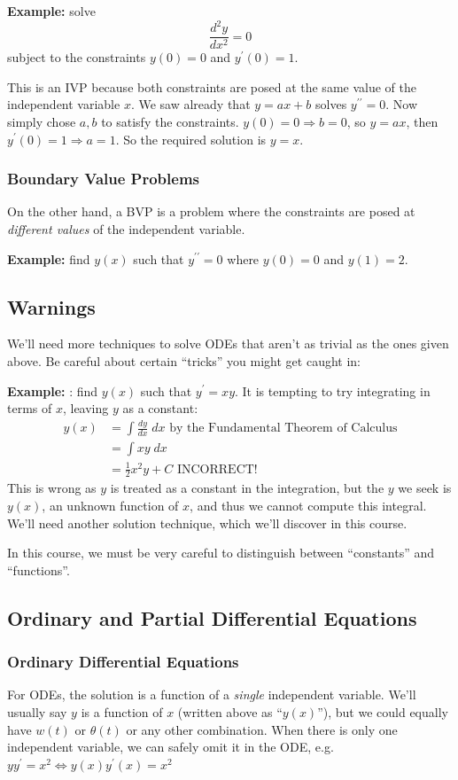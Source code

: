 \documentclass[11pt]{article}
\newcommand{\example}{\textbf{Example: }}
\newcommand{\fdx}{\frac{dy}{dx}} %
\newcommand{\sdx}{\frac{d^2y}{dx^2}}
\newcommand{\yp}{y^{\prime}}
\newcommand{\ypp}{y^{\prime\prime}}
\begin{document}
	\example solve
		$$\sdx = 0$$
		subject to the constraints $y(0) = 0$ and $\yp(0) = 1$.

		This is an IVP because both constraints are posed at the same value of the independent variable $x$.
		We saw already that $y = ax + b$ solves $\ypp = 0$. Now simply chose $a,b$ to satisfy the constraints.
		$y(0) = 0 \Rightarrow b = 0$, so $y = ax$, then $\yp(0) = 1 \Rightarrow a = 1$.
		So the required solution is $y=x$.

\subsubsection{Boundary Value Problems}
	On the other hand, a BVP is a problem where the constraints are posed at \emph{different values} of the independent variable.

	\example find $y(x)$ such that $\ypp = 0$ where $y(0) = 0$ and $y(1) = 2$.

\subsection{Warnings}
	We'll need more techniques to solve ODEs that aren't as trivial as the ones given above.
	Be careful about certain ``tricks'' you might get caught in:

	\example: find $y(x)$ such that $\yp = xy$.
	It is tempting to try integrating in terms of $x$, leaving $y$ as a constant:
		\begin{align*}
			y(x) &= \int \fdx \; dx \text{ by the Fundamental Theorem of Calculus} \\
				&= \int x y \; dx \\
				&= \frac{1}{2} x^2 y + C \text{ INCORRECT!}
		\end{align*}
	This is wrong as $y$ is treated as a constant in the integration, but the $y$ we seek is $y(x)$,
	an unknown function of $x$, and thus we cannot compute this integral.
	We'll need another solution technique, which we'll discover in this course.

	In this course, we must be very careful to distinguish between ``constants'' and ``functions''.

\subsection{Ordinary and Partial Differential Equations}
\subsubsection{Ordinary Differential Equations}
	For ODEs, the solution is a function of a \emph{single} independent variable.
	We'll usually say $y$ is a function of $x$ (written above as ``$y(x)$''), but we could equally have
	$w(t)$ or $\theta(t)$ or any other combination.
	When there is only one independent variable, we can safely omit it in the ODE,
	e.g. $y \yp = x^2 \Leftrightarrow y(x) \yp (x) = x^2$
\end{document}
